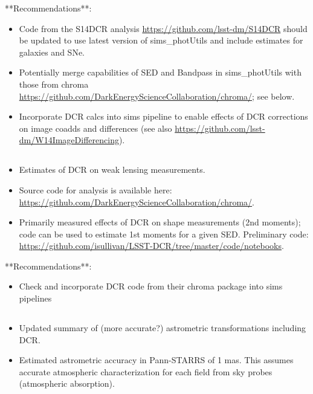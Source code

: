 \documentclass[]{article}
\begin{document}
**Recommendations**:
\begin{itemize}
	\item Code from the S14DCR analysis \url{https://github.com/lsst-dm/S14DCR} should be updated to use latest version of sims\_photUtils and include estimates for galaxies and SNe.
	\item Potentially merge capabilities of SED and Bandpass in sims\_photUtils with those from chroma \url{https://github.com/DarkEnergyScienceCollaboration/chroma/}; see below.
	\item Incorporate DCR calcs into sims pipeline to enable effects of DCR corrections on image coadds and differences (see also \url{https://github.com/lsst-dm/W14ImageDifferencing}).
\end{itemize}

\subsection{\cite{Meyers2015}}

\begin{itemize}
	\item Estimates of DCR on weak lensing measurements.
	\item Source code for analysis is available here:  \url{https://github.com/DarkEnergyScienceCollaboration/chroma/}.
	\item Primarily measured effects of DCR on shape measurements (2nd moments); code can be used to estimate 1st moments for a given SED. Preliminary code: \url{https://github.com/isullivan/LSST-DCR/tree/master/code/notebooks}.
\end{itemize}

**Recommendations**:
\begin{itemize}
	\item Check and incorporate DCR code from their chroma package into sims pipelines
\end{itemize}

\subsection{\cite{Chambers2005}}

\begin{itemize}
	\item Updated summary of (more accurate?) astrometric transformations including DCR.
	\item Estimated astrometric accuracy in Pann-STARRS of 1 mas. This assumes accurate atmospheric characterization for each field from sky probes (atmospheric absorption).
\end{itemize}
\end{document}

